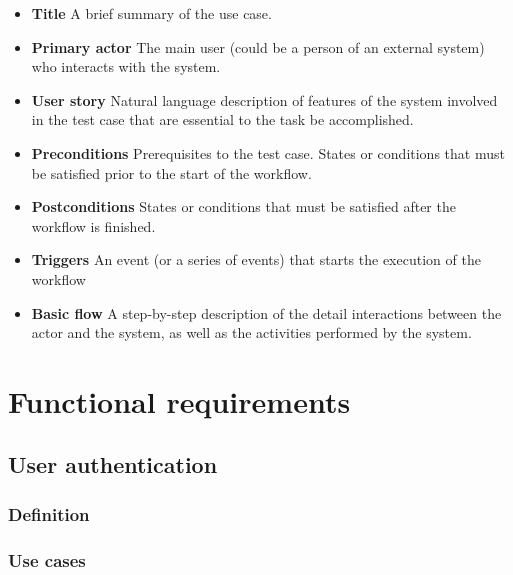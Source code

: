\begin{itemize}

\item \textbf{Title}
A brief summary of the use case.

\item \textbf{Primary actor}
The main user (could be a person of an external system) who interacts with the
system.

\item \textbf{User story}
Natural language description of features of the system involved in the test
case that are essential to the task be accomplished.

\item \textbf{Preconditions}
Prerequisites to the test case.
States or conditions that must be satisfied prior to the start of the workflow.

\item \textbf{Postconditions}
States or conditions that must be satisfied after the workflow is finished.

\item \textbf{Triggers}
An event (or a series of events) that starts the execution of the workflow

\item \textbf{Basic flow}
A step-by-step description of the detail interactions between the actor and
the system, as well as the activities performed by the system.

\end{itemize}



\section{Functional requirements}

\subsection{User authentication}
\subsubsection{Definition}
\subsubsection{Use cases}


